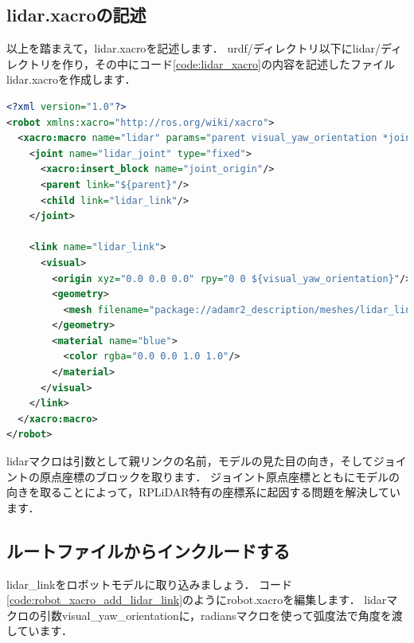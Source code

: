 \documentclass[{../../master}]{subfiles}
\begin{document}
\subsection{\textsf{lidar.xacro}の記述}

以上を踏まえて，\textsf{lidar.xacro}を記述します．
\textsf{urdf/}ディレクトリ以下に\textsf{lidar/}ディレクトリを作り，その中にコード\ref{code:lidar_xacro}の内容を記述したファイル\textsf{lidar.xacro}を作成します．

\begin{lstlisting}[language=XML, label=code:lidar_xacro, caption=\textsf{lidar.xacro}]
<?xml version="1.0"?>
<robot xmlns:xacro="http://ros.org/wiki/xacro">
  <xacro:macro name="lidar" params="parent visual_yaw_orientation *joint_origin">
    <joint name="lidar_joint" type="fixed">
      <xacro:insert_block name="joint_origin"/>
      <parent link="${parent}"/>
      <child link="lidar_link"/>
    </joint>

    <link name="lidar_link">
      <visual>
        <origin xyz="0.0 0.0 0.0" rpy="0 0 ${visual_yaw_orientation}"/>
        <geometry>
          <mesh filename="package://adamr2_description/meshes/lidar_link.STL"/>
        </geometry>
        <material name="blue">
          <color rgba="0.0 0.0 1.0 1.0"/>
        </material>
      </visual>
    </link>
  </xacro:macro>
</robot>
\end{lstlisting}

\textsf{lidar}マクロは引数として親リンクの名前，モデルの見た目の向き，そしてジョイントの原点座標のブロックを取ります．
ジョイント原点座標とともにモデルの向きを取ることによって，RPLiDAR特有の座標系に起因する問題を解決しています．

\subsection{ルートファイルからインクルードする}

\textsf{lidar\_link}をロボットモデルに取り込みましょう．
コード\ref{code:robot_xacro_add_lidar_link}のように\textsf{robot.xacro}を編集します．
\textsf{lidar}マクロの引数\textsf{visual\_yaw\_orientation}に，\textsf{radians}マクロを使って弧度法で角度を渡しています．
\end{document}
